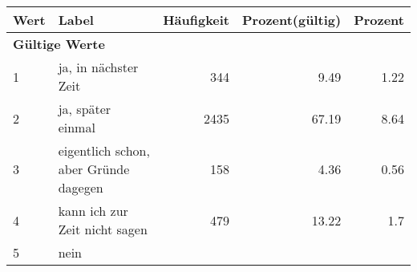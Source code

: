      \begin{longtable}{lXrrr}
     \toprule
     \textbf{Wert} & \textbf{Label} & \textbf{Häufigkeit} & \textbf{Prozent(gültig)} & \textbf{Prozent} \\
     \endhead
     \midrule
     \multicolumn{5}{l}{\textbf{Gültige Werte}}\\

     1 &
     \multicolumn{1}{X}{ ja, in nächster Zeit   } &


       \num{344} &
       \num[round-mode=places,round-precision=2]{9,49} &
         \num[round-mode=places,round-precision=2]{1,22} \\

     2 &
     \multicolumn{1}{X}{ ja, später einmal   } &


       \num{2435} &
       \num[round-mode=places,round-precision=2]{67,19} &
         \num[round-mode=places,round-precision=2]{8,64} \\

     3 &
     \multicolumn{1}{X}{ eigentlich schon, aber Gründe dagegen   } &


       \num{158} &
       \num[round-mode=places,round-precision=2]{4,36} &
         \num[round-mode=places,round-precision=2]{0,56} \\

     4 &
     \multicolumn{1}{X}{ kann ich zur Zeit nicht sagen   } &


       \num{479} &
       \num[round-mode=places,round-precision=2]{13,22} &
         \num[round-mode=places,round-precision=2]{1,7} \\

     5 &
     \multicolumn{1}{X}{ nein   } &



\end{longtable}
